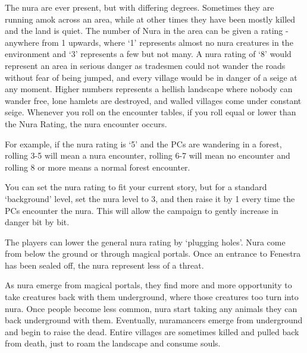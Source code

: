 \begin{multicols}{2}

The nura are ever present, but with differing degrees.
Sometimes they are running amok across an area, while at other times they have been mostly killed and the land is quiet.
The number of Nura in the area can be given a rating - anywhere from 1 upwards, where `1' represents almost no nura creatures in the environment and `3' represents a few but not many.
A nura rating of `8' would represent an area in serious danger as tradesmen could not wander the roads without fear of being jumped, and every village would be in danger of a seige at any moment.
Higher numbers represents a hellish landscape where nobody can wander free, lone hamlets are destroyed, and walled villages come under constant seige.
Whenever you roll on the encounter tables, if you roll equal or lower than the Nura Rating, the nura encounter occurs.

For example, if the nura rating is `5' and the PCs are wandering in a forest, rolling 3-5 will mean a nura encounter, rolling 6-7 will mean no encounter and rolling 8 or more means a normal forest encounter.

You can set the nura rating to fit your current story, but for a standard `background' level, set the nura level to 3, and then raise it by 1 every time the PCs encounter the nura.
This will allow the campaign to gently increase in danger bit by bit.

The players can lower the general nura rating by `plugging holes'.  Nura come from below the ground or through magical portals.  Once an entrance to Fenestra has been sealed off, the nura represent less of a threat.

As nura emerge from magical portals, they find more and more opportunity to take creatures back with them underground, where those creatures too turn into nura.  Once people become less common, nura start taking any animals they can back underground with them.  Eventually, nuramancers emerge from underground and begin to raise the dead.  Entire villages are sometimes killed and pulled back from death, just to roam the landscape and consume souls.


\end{multicols}
